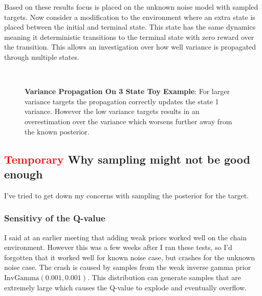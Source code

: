 Based on these results focus is placed on the unknown noise model with sampled targets. Now consider a modification to the environment where an extra state is placed between the initial and terminal state. This state has the same dynamics meaning it deterministic transitions to the terminal state with zero reward over the transition. This allows an investigation over how well variance is propagated through multiple states.

\begin{figure}[H]
    \centering

    \\
    \caption{\textbf{Variance Propagation On 3 State Toy Example}: For larger variance targets the propagation correctly updates the state 1 variance. However the low variance targets results in an overestimation over the variance which worsens further away from the known posterior.}
    \label{fig:proptest}
\end{figure}



\subsection{\textcolor{red}{Temporary} Why sampling might not be good enough}

I've tried to get down my concerns with sampling the posterior for the target.
 
\subsubsection{Sensitivy of the Q-value}

I said at an earlier meeting that adding weak priors worked well on the chain environment. However this was a few weeks after I ran these tests, so I'd forgotten that it worked well for known noise case, but crashes for the unknown noise case. The crash is caused by samples from the weak inverse gamma prior $\text{InvGamma}(0.001, 0.001)$. This distribution can generate samples that are extremely large which causes the Q-value to explode and eventually overflow.

